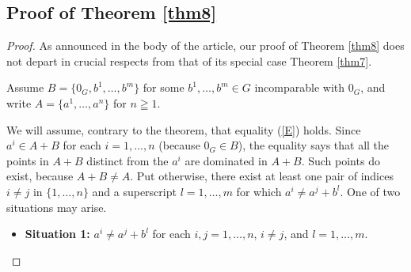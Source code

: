 \documentclass[pdflatex,sn-apa,11pt]{sn-jnl}%
\begin{document}
\subsection{Proof of Theorem \ref{thm8}}
\label{sec5_6}
\begin{proof}
As announced in the body of the article, our proof of Theorem \ref{thm8} does not depart in crucial respects from that of its special case Theorem \ref{thm7}.

Assume $B = \{0_{G}, b^1, \dots, b^m\}$ for some $b^1, \dots, b^m \in G$ incomparable with $0_{G}$, and write $A = \{a^1, \dots, a^n\}$ for $n \geqq 1$. %

We will assume, contrary to the theorem, that equality (\ref{E}) holds. Since $a^i \in A+B$ for each $i = 1, ..., n$ (because $0_{G} \in B$), the equality says that all the points in $A+B$ distinct from the $a^i$ are dominated in $A+B$. Such points do exist, because $A+B \neq A$. 
Put otherwise, there exist at least one pair of indices $i \neq j$ in $\{1, \dots, n\}$ and a superscript $l = 1, \dots, m$ for which $a^{i} \neq a^{j} + b^l$. One of two situations may arise. %

\begin{itemize}
\item{\textbf{Situation 1:}} $a^{i} \neq a^{j} + b^l$ for each $i, j = 1, \dots, n$, $i \neq j$, and $l = 1, \dots, m$. 


\end{itemize}
\end{proof}
\end{document}
